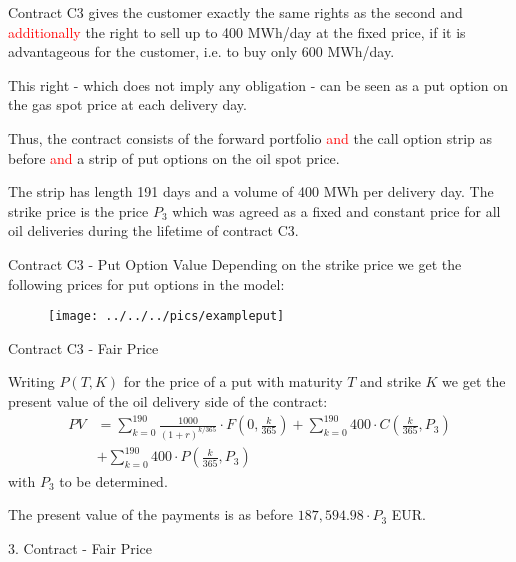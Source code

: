 



	Contract C3 gives the customer exactly the same rights as the second and \textcolor{red}{additionally} the right to sell up to 400 MWh/day at the fixed price, if it is advantageous for the customer, i.e. to buy only 600 MWh/day.


	This right - which does not imply any obligation - can be seen as a put option on the gas spot price at each delivery day.


	Thus, the contract consists of the forward portfolio \textcolor{red}{and} the call option strip as before \textcolor{red}{and} a strip of put options on the oil spot price.


	The strip has length 191 days and a volume of 400 MWh per delivery day. The strike price is the price $P_3$ which was agreed as a fixed and constant price for all oil deliveries during the lifetime of contract C3.





{Contract C3  - Put Option Value}
Depending on the strike price we get the following prices for put options in the model:
\begin{figure}
	\centering
		\texttt{[image: ../../../pics/exampleput]}
	\label{fig:exampleput}
\end{figure}

{Contract C3 - Fair Price}






	Writing $P(T,K)$ for the price of a put with maturity $T$ and strike $K$ we get the present value of the oil delivery side of the contract:
\begin{align*}
	PV &= \sum_{k=0}^{190} \frac{1000}{(1+r)^{k/365}} \cdot F(0,\frac k {365}) + \sum_{k=0}^{190} 400 \cdot C(\frac k {365},P_3)\\
	 &+ \sum_{k=0}^{190} 400 \cdot P(\frac k {365},P_3)
\end{align*}
with $P_3$ to be determined.


	The present value of the payments is as before $187,594.98 \cdot P_3$ EUR.





{3. Contract - Fair Price}






